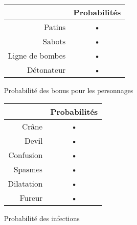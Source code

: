 \begin{figure}[h]
	\begin{center}
		\begin{tabular}{|r|c|}
\hline 
& Probabilités \\ 
\hline 
Patins & • \\ 
\hline 
Sabots & • \\ 
\hline 
Ligne de bombes & • \\ 
\hline 
Détonateur & • \\ 
\hline 
\end{tabular} 
	\end{center}
	\caption{Probabilité des bonus pour les personnages}
\end{figure}

\begin{figure}[h]
	\begin{center}
		\begin{tabular}{|r|c|}
\hline 
& Probabilités \\ 
\hline 
Crâne & • \\ 
\hline 
Devil & • \\ 
\hline 
Confusion & • \\ 
\hline 
Spasmes & • \\ 
\hline 
Dilatation & • \\ 
\hline 
Fureur & • \\ 
\hline 
\end{tabular} 
	\end{center}
	\caption{Probabilité des infections}
\end{figure}